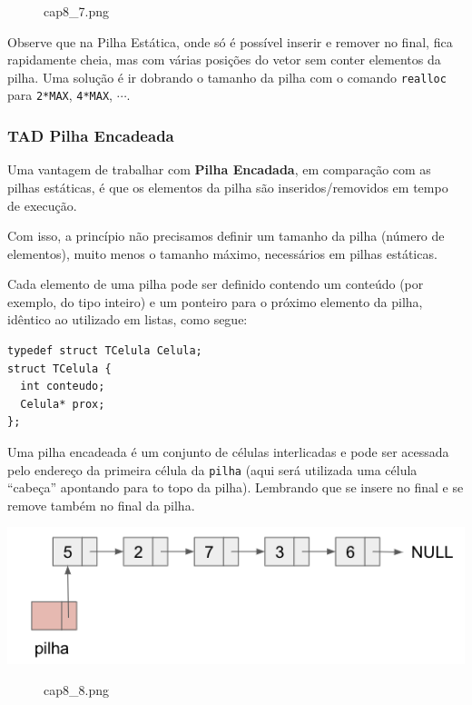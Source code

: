 \documentclass[12pt,a4paper]{article}
\begin{document}
    \begin{figure}
\centering
\caption{cap8\_7.png}
\end{figure}

    Observe que na Pilha Estática, onde só é possível inserir e remover no
final, fica rapidamente cheia, mas com várias posições do vetor sem
conter elementos da pilha. Uma solução é ir dobrando o tamanho da pilha
com o comando \texttt{realloc} para \texttt{2*MAX}, \texttt{4*MAX},
\(\cdots\).

    \hypertarget{tad-pilha-encadeada}{%
\subsubsection{TAD Pilha Encadeada}\label{tad-pilha-encadeada}}

    Uma vantagem de trabalhar com \textbf{Pilha Encadada}, em comparação com
as pilhas estáticas, é que os elementos da pilha são inseridos/removidos
em tempo de execução.

Com isso, a princípio não precisamos definir um tamanho da pilha (número
de elementos), muito menos o tamanho máximo, necessários em pilhas
estáticas.

Cada elemento de uma pilha pode ser definido contendo um conteúdo (por
exemplo, do tipo inteiro) e um ponteiro para o próximo elemento da
pilha, idêntico ao utilizado em listas, como segue:

\begin{verbatim}
typedef struct TCelula Celula;
struct TCelula {
  int conteudo;
  Celula* prox;
};
\end{verbatim}

Uma pilha encadeada é um conjunto de células interlicadas e pode ser
acessada pelo endereço da primeira célula da \texttt{pilha} (aqui será
utilizada uma célula ``cabeça'' apontando para to topo da pilha).
Lembrando que se insere no final e se remove também no final da pilha.

\includegraphics{"figs/cap8_8.png"}

    \begin{figure}
\centering
\caption{cap8\_8.png}
\end{figure}
\end{document}
